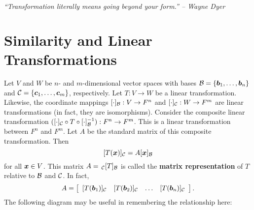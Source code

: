 \begin{center} 
\emph{``Transformation literally means going beyond your form.'' -- Wayne Dyer}
\end{center}

\section{Similarity and Linear Transformations}\label{sec:similar}
Let $V$ and $W$ be $n$- and $m$-dimensional vector spaces with bases $\B = \{\bb b_1, \ldots, \bb b_n\}$ and $\c = \{\bb c_1, \ldots, \bb c_m\}$, respectively. Let $T: V\to W$ be a linear transformation. Likewise, the coordinate mappings $[\cdot]_\B : V \to F^n$ and $[\cdot]_\c : W \to F^m$ are linear transformations (in fact, they are isomorphisms). Consider the composite linear transformation $([\cdot]_\c\circ T\circ [\cdot]_\B^{-1}) : F^n\to F^m$. This is a linear transformation between $F^n$ and $F^m$. Let $A$ be the standard matrix of this composite transformation. Then 
\[[T(\bb x)]_\c = A[\bb x]_\B\] for all $\bb x\in V$. This matrix $A =  \,_\c[T]_\B$ is called the \textbf{matrix representation} of $T$ relative to $\B$ and $\c$. In fact, 
\[A = \mtx{cccc}{[T(\bb b_1)]_\c & [T(\bb b_2)]_\c & \ldots & [T(\bb b_n)]_\c}.\]  The following diagram may be useful in remembering the relationship here:
\begin{center}
\end{center}


